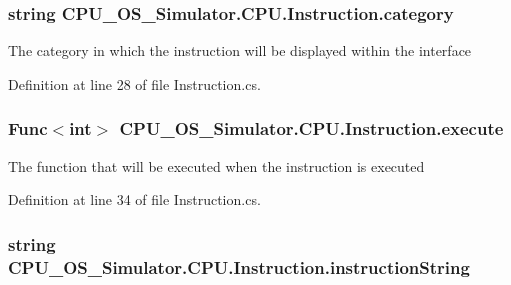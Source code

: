\subsubsection[{category}]{\setlength{\rightskip}{0pt plus 5cm}string C\+P\+U\+\_\+\+O\+S\+\_\+\+Simulator.\+C\+P\+U.\+Instruction.\+category\hspace{0.3cm}{\ttfamily [private]}}\label{class_c_p_u___o_s___simulator_1_1_c_p_u_1_1_instruction_ac572af7b3bda0a6b0918069c1f3b14b4}


The category in which the instruction will be displayed within the interface 



Definition at line 28 of file Instruction.\+cs.

\hypertarget{class_c_p_u___o_s___simulator_1_1_c_p_u_1_1_instruction_ae6c5e3409f33f49c745ab57ca9a885a9}{}
\subsubsection[{execute}]{\setlength{\rightskip}{0pt plus 5cm}Func$<$int$>$ C\+P\+U\+\_\+\+O\+S\+\_\+\+Simulator.\+C\+P\+U.\+Instruction.\+execute\hspace{0.3cm}{\ttfamily [private]}}\label{class_c_p_u___o_s___simulator_1_1_c_p_u_1_1_instruction_ae6c5e3409f33f49c745ab57ca9a885a9}


The function that will be executed when the instruction is executed 



Definition at line 34 of file Instruction.\+cs.

\hypertarget{class_c_p_u___o_s___simulator_1_1_c_p_u_1_1_instruction_ab58373ca153de047b36c1036e07db7a8}{}
\subsubsection[{instruction\+String}]{\setlength{\rightskip}{0pt plus 5cm}string C\+P\+U\+\_\+\+O\+S\+\_\+\+Simulator.\+C\+P\+U.\+Instruction.\+instruction\+String\hspace{0.3cm}{\ttfamily [private]}}\label{class_c_p_u___o_s___simulator_1_1_c_p_u_1_1_instruction_ab58373ca153de047b36c1036e07db7a8}


